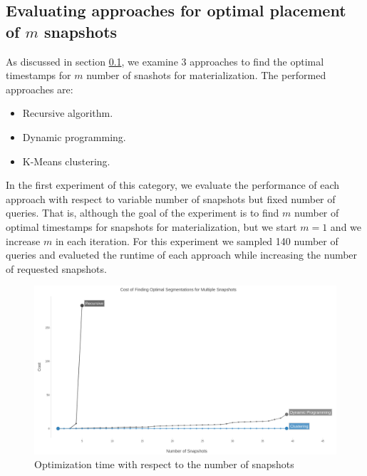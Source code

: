 \subsection{Evaluating approaches for optimal placement of $m$ snapshots}
As discussed in section \ref{}, we examine 3 approaches to find the optimal timestamps for $m$ number of snashots for materialization. The performed approaches are:
\begin{itemize}
	\item Recursive algorithm.
	\item Dynamic programming.
	\item K-Means clustering.
\end{itemize}


In the first experiment of this category, we evaluate the performance of each approach with respect to variable number of snapshots but fixed number of queries. That is, although the goal of the experiment is to find $m$ number of optimal timestamps for snapshots for materialization, but we start $m=1$ and we increase $m$ in each iteration. For this experiment we sampled 140 number of queries and evalueted the runtime of each approach while increasing the number of requested snapshots.

\begin{figure}
	\label{fig:variable_snapshots}
	\centering
	\includegraphics[width=\textwidth]{figs/variable_snapshots.jpg}
	\caption{Optimization time with respect to the number of snapshots}
\end{figure} 


